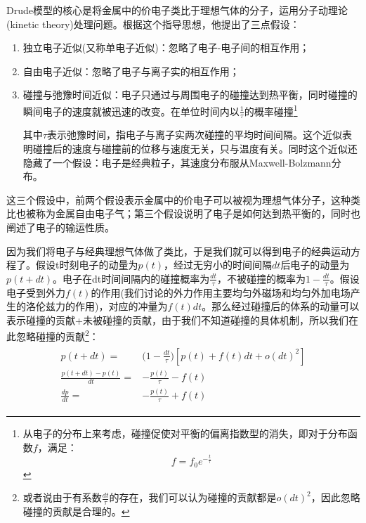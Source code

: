 \documentclass{ctexart}
\begin{document}
                 Drude模型的核心是将金属中的价电子类比于理想气体的分子，运用分子动理论(kinetic theory)处理问题。根据这个指导思想，他提出了三点假设：
            \begin{enumerate}
                \item 独立电子近似(又称单电子近似)：忽略了电子-电子间的相互作用；
                \item 自由电子近似：忽略了电子与离子实的相互作用；
                \item 碰撞与弛豫时间近似：电子只通过与周围电子的碰撞达到热平衡，同时碰撞的瞬间电子的速度就被迅速的改变。在单位时间内以$\frac{1}{\tau}$的概率碰撞\footnote{从电子的分布上来考虑，碰撞促使对平衡的偏离指数型的消失，即对于分布函数$f$，满足：
                \begin{equation*}
                    f=f_0e^{-\frac{t}{\tau}}
                \end{equation*}}
                
                其中$\tau$表示弛豫时间，指电子与离子实两次碰撞的平均时间间隔。这个近似表明碰撞后的速度与碰撞前的位移与速度无关，只与温度有关。同时这个近似还隐藏了一个假设：电子是经典粒子，其速度分布服从Maxwell-Bolzmann分布。
            \end{enumerate}
            
            这三个假设中，前两个假设表示金属中的价电子可以被视为理想气体分子，这种类比也被称为金属自由电子气；第三个假设说明了电子是如何达到热平衡的，同时也阐述了电子的输运性质。
            
           因为我们将电子与经典理想气体做了类比，于是我们就可以得到电子的经典运动方程了。假设t时刻电子的动量为$p(t)$，经过无穷小的时间间隔$dt$后电子的动量为$p(t+dt)$。电子在dt时间间隔内的碰撞概率为$\frac{dt}{\tau}$，不被碰撞的概率为$1-\frac{dt}{\tau}$。假设电子受到外力$f(t)$的作用(我们讨论的外力作用主要均匀外磁场和均匀外加电场产生的洛伦兹力的作用)，对应的冲量为$f(t)dt$。那么经过碰撞后的体系的动量可以表示碰撞的贡献+未被碰撞的贡献，由于我们不知道碰撞的具体机制，所以我们在此忽略碰撞的贡献\footnote{或者说由于有系数$\frac{dt}{\tau}$的存在，我们可以认为碰撞的贡献都是$o(dt)^2$，因此忽略碰撞的贡献是合理的。}：
            \begin{align}\label{electron_motion_equation}
                \begin{split}
                     p(t+dt)=&\Big(1-\frac{dt}{\tau}\Big)[p(t)+f(t)dt+o(dt)^2]\\
                     \frac{p(t+dt)-p(t)}{dt}=&-\frac{p(t)}{\tau}-f(t)\\
                     \frac{dp}{dt}=&-\frac{p(t)}{\tau}+f(t)
                \end{split}
            \end{align}
            
\end{document}
